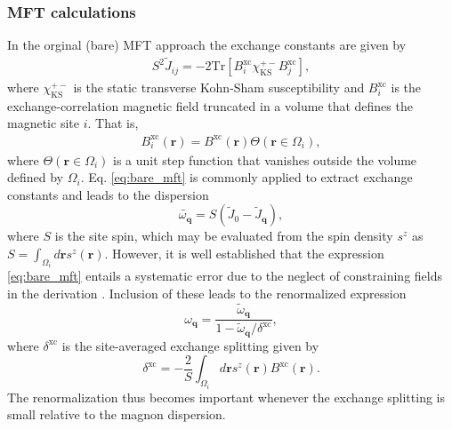 \documentclass[aps,prb,reprint,floatfix,superscriptaddress]{revtex4-2}
\begin{document}
\subsubsection{MFT calculations}
In the orginal (bare) MFT approach the exchange constants are given by \cite{LIECHTENSTEIN198765,Durhuus2023}
\begin{align}\label{eq:bare_mft}
S^2\tilde J_{ij}=-2\mathrm{Tr}[B_i^\mathrm{xc}\chi^{+-}_\mathrm{KS}B_j^\mathrm{xc}],
\end{align}
where $\chi^{+-}_\mathrm{KS}$ is the static transverse Kohn-Sham susceptibility and $B_i^\mathrm{xc}$ is the exchange-correlation magnetic field truncated in a volume that defines the magnetic site $i$. That is,
\begin{align}
B_i^\mathrm{xc}(\mathbf{r})=B^\mathrm{xc}(\mathbf{r})\Theta(\mathbf{r}\in\Omega_i),
\end{align}
where $\Theta(\mathbf{r}\in\Omega_i)$ is a unit step function that vanishes outside the volume defined by $\Omega_i$. Eq. \eqref{eq:bare_mft} is commonly applied to extract exchange constants and leads to the dispersion 
\begin{equation}
    \tilde{\omega_{\mathbf{q}}} = S(\tilde J_0 - \tilde J_{\mathbf{q}}),
\end{equation}
where $S$ is the site spin, which may be evaluated from the spin density $s^z$ as  $S=\int_{\Omega_i}d\mathbf{r}s^z(\mathbf{r})$. However, it is well established that the expression \eqref{eq:bare_mft} entails a systematic error due to the neglect of constraining fields in the derivation \cite{Bruno2003}. Inclusion of these leads to the renormalized expression
\begin{equation}
    \omega_{\mathbf{q}} = \frac{\tilde\omega_\mathbf{q}}{1 - \tilde\omega_\mathbf{q}/\delta^\mathrm{xc}},
\end{equation}
where $\delta^\mathrm{xc}$ is the site-averaged exchange splitting given by
\begin{equation}
\delta^\mathrm{xc}=-\frac{2}{S}\int_{\Omega_i}d\mathbf{r}s^z(\mathbf{r})B^\mathrm{xc}(\mathbf{r}).
\end{equation}
The renormalization thus becomes important whenever the exchange splitting is small relative to the magnon dispersion.
\end{document}
